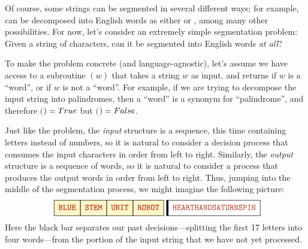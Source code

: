 Of course, some strings can be segmented in several different ways; for example,  can be decomposed into English words as either  or , among many other possibilities.
For now, let’s consider an extremely simple segmentation problem: Given a string of characters, can it be segmented into English words \textit{at all}?

To make the problem concrete (and language-agnostic), let’s assume we have access to a subroutine $(w)$ that takes a string $w$ as input, and returns  if $w$ is a “word”, or  if $w$ is not a “word”.
For example, if we are trying to decompose the input string into palindromes, then a “word” is a synonym for “palindrome”, and therefore $($$) = True$ but $($$) = False$.

Just like the  problem, the \textit{input} structure is a sequence, this time containing letters instead of numbers, so it is natural to consider a decision process that consumes the input characters in order from left to right.
Similarly, the \textit{output} structure is a sequence of words, so it is natural to consider a process that produces the output words in order from left to right.
Thus, jumping into the middle of the segmentation process, we might imagine the following picture:
\[
\Segments{BLUE,STEM,UNIT,ROBOT}{HEARTHANDSATURNSPIN}
\]
Here the black bar separates our past decisions---splitting the first 17 letters into four words---from the portion of the input string that we have not yet processed.

